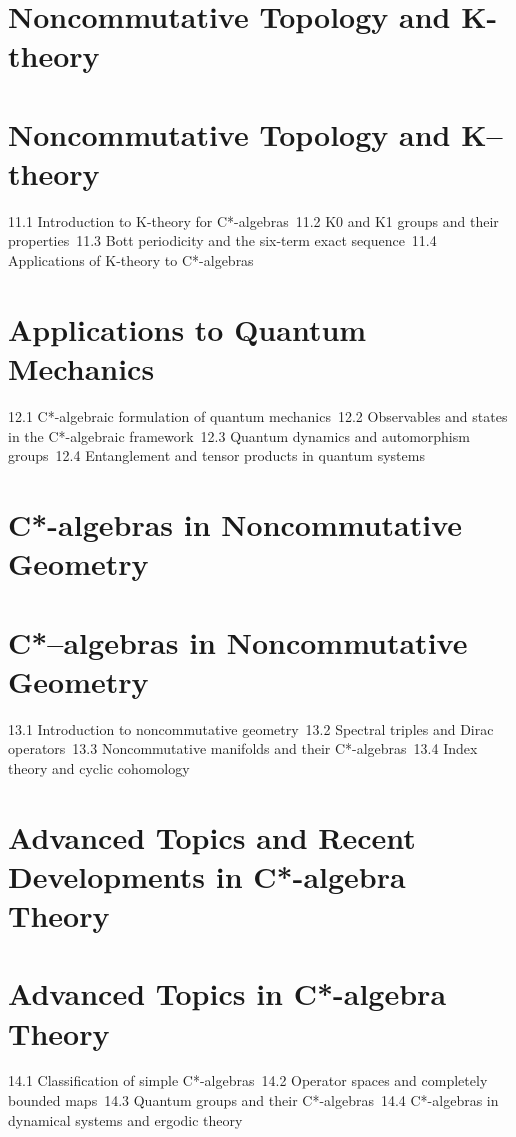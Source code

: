 \section{Noncommutative Topology and K-theory}
\section{Noncommutative Topology and K–theory}
11.1 Introduction to K-theory for C*-algebras\
11.2 K0 and K1 groups and their properties\
11.3 Bott periodicity and the six-term exact sequence\
11.4 Applications of K-theory to C*-algebras\
\section{Applications to Quantum Mechanics}
12.1 C*-algebraic formulation of quantum mechanics\
12.2 Observables and states in the C*-algebraic framework\
12.3 Quantum dynamics and automorphism groups\
12.4 Entanglement and tensor products in quantum systems\
\section{C*-algebras in Noncommutative Geometry}
\section{C*–algebras in Noncommutative Geometry}
13.1 Introduction to noncommutative geometry\
13.2 Spectral triples and Dirac operators\
13.3 Noncommutative manifolds and their C*-algebras\
13.4 Index theory and cyclic cohomology\
\section{Advanced Topics and Recent Developments in C*-algebra Theory}
\section{Advanced Topics in C*-algebra Theory}
14.1 Classification of simple C*-algebras\
14.2 Operator spaces and completely bounded maps\
14.3 Quantum groups and their C*-algebras\
14.4 C*-algebras in dynamical systems and ergodic theory\
